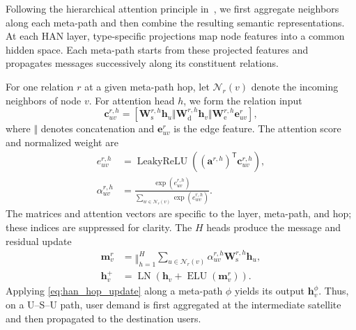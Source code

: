 \documentclass[journal]{IEEEtran}
\begin{document}
Following the hierarchical attention principle
in~\cite{wang2019han}, we first aggregate neighbors along
each meta-path and then combine the resulting semantic
representations. At each HAN layer, type-specific projections
map node features into a common hidden space. Each meta-path
starts from these projected features and propagates messages
successively along its constituent relations.

For one relation $r$ at a given meta-path hop, let
$\mathcal{N}_r(v)$ denote the incoming neighbors of node $v$.
For attention head $h$, we form the relation input
\begin{equation}
\mathbf{c}_{uv}^{r,h}
=
\left[
\mathbf{W}_{\mathrm s}^{r,h}\mathbf{h}_u
\Vert
\mathbf{W}_{\mathrm d}^{r,h}\mathbf{h}_v
\Vert
\mathbf{W}_{\mathrm e}^{r,h}\mathbf{e}_{uv}^{r}
\right],
\label{eq:han_attention_input}
\end{equation}
where $\Vert$ denotes concatenation and
$\mathbf{e}_{uv}^{r}$ is the edge feature.
The attention score and normalized weight are
\begin{equation}
\begin{aligned}
e_{uv}^{r,h}
&=
\operatorname{LeakyReLU}
\left(
(\mathbf{a}^{r,h})^{\mathsf T}
\mathbf{c}_{uv}^{r,h}
\right),\\
\alpha_{uv}^{r,h}
&=
\frac{\exp(e_{uv}^{r,h})}
{\sum_{w\in\mathcal{N}_r(v)}
 \exp(e_{wv}^{r,h})}.
\end{aligned}
\label{eq:han_relation_attention}
\end{equation}
The matrices and attention vectors are specific to the layer,
meta-path, and hop; these indices are suppressed for clarity.
The $H$ heads produce the message and residual update
\begin{equation}
\begin{aligned}
\mathbf{m}_v^r
&=
\mathop{\Vert}_{h=1}^{H}
\sum_{u\in\mathcal{N}_r(v)}
\alpha_{uv}^{r,h}
\mathbf{W}_{\mathrm s}^{r,h}\mathbf{h}_u,\\
\mathbf{h}_v^{+}
&=
\operatorname{LN}
\left(
\mathbf{h}_v+
\operatorname{ELU}(\mathbf{m}_v^r)
\right).
\end{aligned}
\label{eq:han_hop_update}
\end{equation}
Applying \eqref{eq:han_hop_update} along a meta-path $\phi$
yields its output $\mathbf{h}_v^\phi$.
Thus, on a U--S--U path, user demand is first aggregated
at the intermediate satellite and then propagated to
the destination users.
\end{document}
